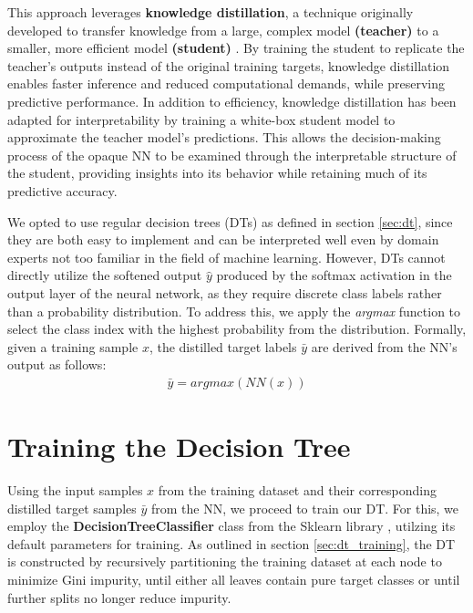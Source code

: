This approach leverages \textbf{knowledge distillation},
a technique originally developed to transfer knowledge from a large,
complex model \textbf{(teacher)} to a smaller,
more efficient model \textbf{(student)} \cite{knowledge_distillation}.
By training the student to replicate the teacher's outputs instead of the original training targets,
knowledge distillation enables faster inference and reduced computational demands,
while preserving predictive performance.
In addition to efficiency, knowledge distillation has been adapted for interpretability
by training a white-box student model to approximate the teacher model's predictions. \cite{knowledge_distillation_trees}
This allows the decision-making process of the opaque NN
to be examined through the interpretable structure of the student,
providing insights into its behavior while retaining much of its predictive accuracy.

We opted to use regular decision trees (DTs) as defined in section \ref{sec:dt},
since they are both easy to implement and can be interpreted well
even by domain experts not too familiar in the field of machine learning.
However, DTs cannot directly utilize the softened output $\hat{y}$ produced by the softmax activation
in the output layer of the neural network,
as they require discrete class labels rather than a probability distribution.
To address this, we apply the \textit{argmax} function to select the class index
with the highest probability from the distribution.
Formally, given a training sample $x$,
the distilled target labels $\bar{y}$ are derived from the NN's output as follows:
\begin{align}
    \bar{y} = \textit{argmax}(\textit{NN}(x))
\end{align}


\section{Training the Decision Tree}
Using the input samples $x$ from the training dataset
and their corresponding distilled target samples $\bar{y}$ from the NN, we proceed to train our DT.
For this, we employ the \textbf{DecisionTreeClassifier} class from the Sklearn library \cite{sklearn},
utilzing its default parameters for training.
As outlined in section \ref{sec:dt_training},
the DT is constructed by recursively partitioning the training dataset at each node to minimize Gini impurity,
until either all leaves contain pure target classes or until further splits no longer reduce impurity.

